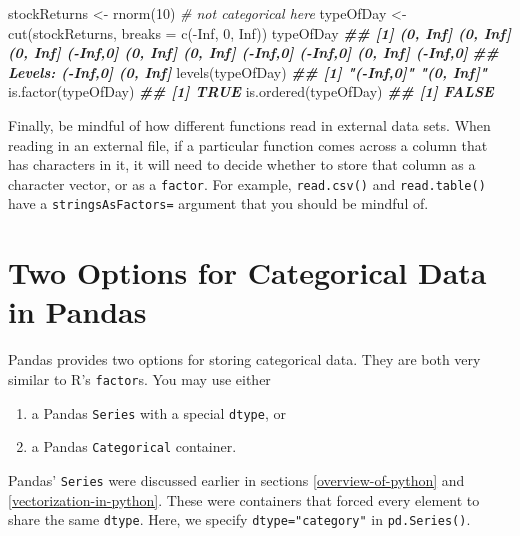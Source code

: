 \documentclass[
  12pt,
  krantz2]{krantz}
\makeatletter
\newenvironment{Shaded}{\begin{snugshade}}{\end{snugshade}}
\newcommand{\AttributeTok}[1]{\textcolor[rgb]{0.61,0.61,0.61}{#1}}
\newcommand{\CommentTok}[1]{\textcolor[rgb]{0.37,0.37,0.37}{\textit{#1}}}
\newcommand{\ConstantTok}[1]{\textcolor[rgb]{0,0,0}{#1}}
\newcommand{\DecValTok}[1]{\textcolor[rgb]{0.06,0.06,0.06}{#1}}
\newcommand{\DocumentationTok}[1]{\textcolor[rgb]{0.37,0.37,0.37}{\textbf{\textit{#1}}}}
\newcommand{\FunctionTok}[1]{\textcolor[rgb]{0,0,0}{#1}}
\newcommand{\NormalTok}[1]{#1}
\newcommand{\OtherTok}[1]{\textcolor[rgb]{0.37,0.37,0.37}{#1}}
\newcommand{\SpecialCharTok}[1]{\textcolor[rgb]{0,0,0}{#1}}
\providecommand{\tightlist}{%
  \setlength{\itemsep}{0pt}\setlength{\parskip}{0pt}}
\newenvironment{kframe}{%
\medskip{}
\setlength{\fboxsep}{.8em}
 \def\at@end@of@kframe{}%
 \ifinner\ifhmode%
  \def\at@end@of@kframe{\end{minipage}}%
  \begin{minipage}{\columnwidth}%
 \fi\fi%
 \def\FrameCommand##1{\hskip\@totalleftmargin \hskip-\fboxsep
 \colorbox{shadecolor}{##1}\hskip-\fboxsep
     \hskip-\linewidth \hskip-\@totalleftmargin \hskip\columnwidth}%
 \MakeFramed {\advance\hsize-\width
   \@totalleftmargin\z@ \linewidth\hsize
   \@setminipage}}%
 {\par\unskip\endMakeFramed%
 \at@end@of@kframe}
\renewenvironment{Shaded}{\begin{kframe}}{\end{kframe}}
\makeatother
\begin{document}
\begin{Shaded}
\begin{Highlighting}[]
\NormalTok{stockReturns }\OtherTok{\textless{}{-}} \FunctionTok{rnorm}\NormalTok{(}\DecValTok{10}\NormalTok{) }\CommentTok{\# not categorical here}
\NormalTok{typeOfDay }\OtherTok{\textless{}{-}} \FunctionTok{cut}\NormalTok{(stockReturns, }\AttributeTok{breaks =} \FunctionTok{c}\NormalTok{(}\SpecialCharTok{{-}}\ConstantTok{Inf}\NormalTok{, }\DecValTok{0}\NormalTok{, }\ConstantTok{Inf}\NormalTok{)) }
\NormalTok{typeOfDay}
\DocumentationTok{\#\#  [1] (0, Inf] (0, Inf] (0, Inf] ({-}Inf,0] (0, Inf] (0, Inf] ({-}Inf,0] ({-}Inf,0] (0, Inf] ({-}Inf,0]}
\DocumentationTok{\#\# Levels: ({-}Inf,0] (0, Inf]}
\FunctionTok{levels}\NormalTok{(typeOfDay)}
\DocumentationTok{\#\# [1] "({-}Inf,0]" "(0, Inf]"}
\FunctionTok{is.factor}\NormalTok{(typeOfDay)}
\DocumentationTok{\#\# [1] TRUE}
\FunctionTok{is.ordered}\NormalTok{(typeOfDay)}
\DocumentationTok{\#\# [1] FALSE}
\end{Highlighting}
\end{Shaded}

Finally, be mindful of how different functions read in external data sets. When reading in an external file, if a particular function comes across a column that has characters in it, it will need to decide whether to store that column as a character vector, or as a \texttt{factor}. For example, \texttt{read.csv()} and \texttt{read.table()} have a \texttt{stringsAsFactors=} argument that you should be mindful of.

\hypertarget{two-options-for-categorical-data-in-pandas}{%
\section{Two Options for Categorical Data in Pandas}\label{two-options-for-categorical-data-in-pandas}}

Pandas provides two options for storing categorical data. They are both very similar to R's \texttt{factor}s. You may use either

\begin{enumerate}
\def\labelenumi{\arabic{enumi}.}
\tightlist
\item
  a Pandas \texttt{Series} with a special \texttt{dtype}, or
\item
  a Pandas \texttt{Categorical} container.
\end{enumerate}

Pandas' \texttt{Series} were discussed earlier in sections \ref{overview-of-python} and \ref{vectorization-in-python}. These were containers that forced every element to share the same \texttt{dtype}. Here, we specify \texttt{dtype="category"} in \texttt{pd.Series()}.
\end{document}
